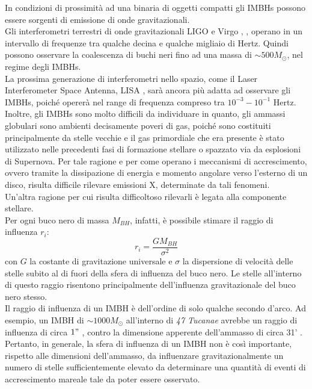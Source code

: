 In condizioni di prossimità ad una binaria di oggetti compatti gli IMBHs possono essere sorgenti di emissione di onde gravitazionali.\\ 
Gli interferometri terrestri di onde gravitazionali LIGO e Virgo \cite{ligo:online}, \cite{virgo:online}, \cite{ligovirgo1:paper} operano in un intervallo di frequenze tra 
qualche decina e qualche migliaio di Hertz. Quindi possono osservare la coalescenza di buchi neri fino ad una massa di
$\sim 500 M_{\odot}$, nel regime degli IMBHs.\\ 
La prossima generazione di interferometri nello
spazio, come il Laser Interferometer Space Antenna, LISA \cite{amaro:paper}, sarà ancora più adatta ad osservare gli IMBHs, poiché opererà nel range di frequenza compreso tra $10^{-3}-10^{-1}$ Hertz.\\
Inoltre, gli IMBHs sono molto difficili da individuare in quanto, gli ammassi globulari sono ambienti decisamente poveri di gas, poiché sono costituiti principalmente da stelle vecchie e il gas primordiale che era presente è stato utilizzato nelle precedenti fasi di formazione stellare o spazzato via da esplosioni di Supernova. Per tale ragione e per come operano i meccanismi di accrescimento, ovvero tramite la dissipazione di energia e momento angolare verso l'esterno di un disco, risulta difficile rilevare emissioni X, determinate da tali fenomeni.\\
Un'altra ragione per cui risulta difficoltoso rilevarli è legata alla componente stellare.\\
Per ogni buco nero di massa $M_{BH}$, infatti, è possibile stimare il raggio di influenza $r_{i}$:
\begin{equation}
r_{i}=\frac{G M_{B H}}{\sigma^{2}}
\label{eq:rinfl}
\end{equation}
con $G$ la costante di gravitazione universale e $\sigma$ la dispersione di velocità delle stelle subito al di fuori della sfera di influenza del buco nero. Le stelle all’interno di questo raggio risentono principalmente dell’influenza gravitazionale del buco nero stesso.\\
Il raggio di influenza di un IMBH è dell'ordine di solo qualche secondo d'arco. Ad esempio, un IMBH di $\sim1000M_{\odot}$ all'interno di \textit{47 Tucanae} avrebbe un raggio di influenza di circa $1"$ \cite{jenny:paper}, contro la dimensione apperente dell'ammasso di circa 31' \cite{47tuc:online}. Pertanto, in generale, la sfera di influenza di un IMBH non è così importante, rispetto alle dimensioni dell'ammasso, da influenzare gravitazionalmente un numero di stelle sufficientemente elevato da determinare una quantità di eventi di accrescimento mareale tale da poter essere osservato. 

